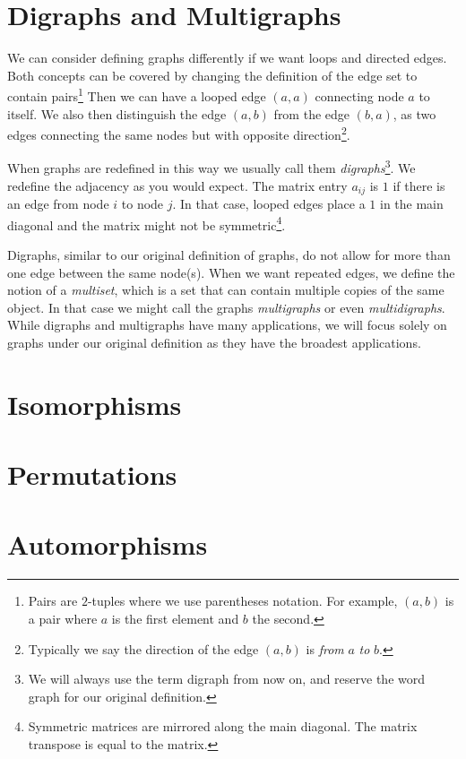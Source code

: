 \documentclass{iansnotes}
\begin{document}
\section{Digraphs and Multigraphs}
  We can consider defining graphs differently if we want loops and directed edges.
  Both concepts can be covered by changing the definition of the edge set to contain pairs\footnote{Pairs are $2$-tuples where we use parentheses notation. For example, $(a,b)$ is a pair where $a$ is the first element and $b$ the second.}
  Then we can have a looped edge $(a,a)$ connecting node $a$ to itself.
  We also then distinguish the edge $(a,b)$ from the edge $(b,a)$, as two edges connecting the same nodes but with opposite direction\footnote{Typically we say the direction of the edge $(a,b)$ is \emph{from} $a$ \emph{to} $b$.}.

  When graphs are redefined in this way we usually call them \emph{digraphs}\footnote{We will always use the term digraph from now on, and reserve the word graph for our original definition.}.
  We redefine the adjacency as you would expect.
  The matrix entry $a_{ij}$ is $1$ if there is an edge from node $i$ to node $j$.
  In that case, looped edges place a $1$ in the main diagonal and the matrix might not be symmetric\footnote{Symmetric matrices are mirrored along the main diagonal. The matrix transpose is equal to the matrix.}.

  Digraphs, similar to our original definition of graphs, do not allow for more than one edge between the same node(s).
  When we want repeated edges, we define the notion of a \emph{multiset}, which is a set that can contain multiple copies of the same object.
  In that case we might call the graphs \emph{multigraphs} or even \emph{multidigraphs}.
  While digraphs and multigraphs have many applications, we will focus solely on graphs under our original definition as they have the broadest applications.

\section{Isomorphisms}

\section{Permutations}

\section{Automorphisms}
\end{document}
